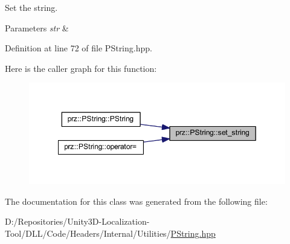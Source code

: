 Set the string. 


\begin{DoxyParams}{Parameters}
{\em str} & \\
\hline
\end{DoxyParams}


Definition at line 72 of file P\+String.\+hpp.

Here is the caller graph for this function\+:
\nopagebreak
\begin{figure}[H]
\begin{center}
\leavevmode
\includegraphics[width=349pt]{classprz_1_1_p_string_afcef04054a81bea83bca47ea3eb2a625_icgraph}
\end{center}
\end{figure}


The documentation for this class was generated from the following file\+:\begin{DoxyCompactItemize}
\item 
D\+:/\+Repositories/\+Unity3\+D-\/\+Localization-\/\+Tool/\+D\+L\+L/\+Code/\+Headers/\+Internal/\+Utilities/\mbox{\hyperlink{_p_string_8hpp}{P\+String.\+hpp}}\end{DoxyCompactItemize}

